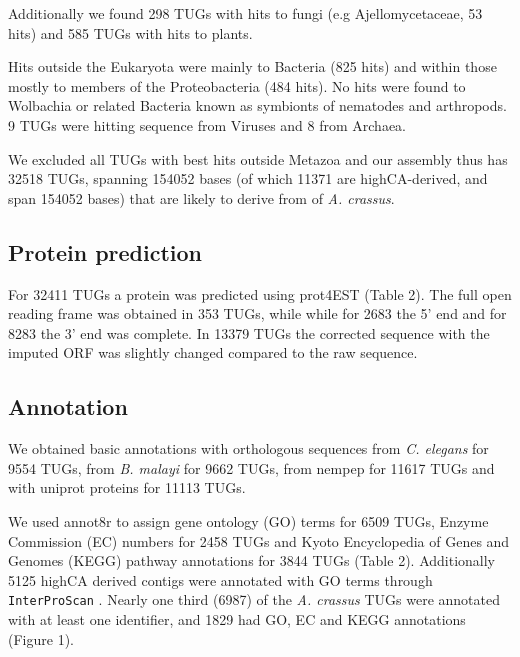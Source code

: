 \documentclass[10pt]{bmc_article}
\newenvironment{bmcformat}{\begin{raggedright}\baselineskip20pt\sloppy\setboolean{publ}{false}}{\end{raggedright}\baselineskip20pt\sloppy}
\begin{document}
\begin{bmcformat}
Additionally we found 298 TUGs with hits to
fungi (e.g Ajellomycetaceae, 53 hits) and
585 TUGs with hits to plants.

Hits outside the Eukaryota were mainly to Bacteria (825 hits) and
within those mostly to members of the Proteobacteria (484 hits). No
hits were found to Wolbachia or related Bacteria known as symbionts of
nematodes and arthropods. 9 TUGs were hitting sequence from Viruses and
8 from Archaea.

We excluded all TUGs with best hits outside Metazoa and our assembly
thus has 32518 TUGs, spanning
154052 bases (of which
11371 are highCA-derived, and
span 154052 bases) that
are likely to derive from of \textit{A. crassus}.

\subsection*{Protein prediction}
















For
32411
TUGs a protein was predicted using prot4EST
\cite{wasmuth_prot4est:_2004} (Table 2). The full open reading frame
was obtained in
353 TUGs, while
while for 2683 the
5’ end and for 8283
the 3' end was complete. In 13379 TUGs the
corrected sequence with the imputed ORF was slightly changed compared
to the raw sequence.

\subsection*{Annotation}

We obtained basic annotations with orthologous sequences from
\textit{C. elegans} for
9554 TUGs,
from \textit{B. malayi} for
9662 TUGs,
from nempep \cite{parkinson_nembase:resource_2004, pmid21550347} for
11617
TUGs and with uniprot proteins for
11113 TUGs.

We used annot8r \cite{schmid_annot8r:_2008} to assign gene ontology
(GO) terms for 6509 TUGs, Enzyme Commission (EC) numbers for
2458 TUGs and Kyoto Encyclopedia of Genes and Genomes (KEGG)
pathway annotations for 3844 TUGs (Table 2). Additionally
5125 highCA derived contigs were annotated with GO terms
through \texttt{InterProScan} \cite{pmid11590104}. Nearly one third
(6987) of the \textit{A. crassus} TUGs were
annotated with at least one identifier, and 1829 had
GO, EC and KEGG annotations (Figure 1).


\end{bmcformat}
\end{document}
